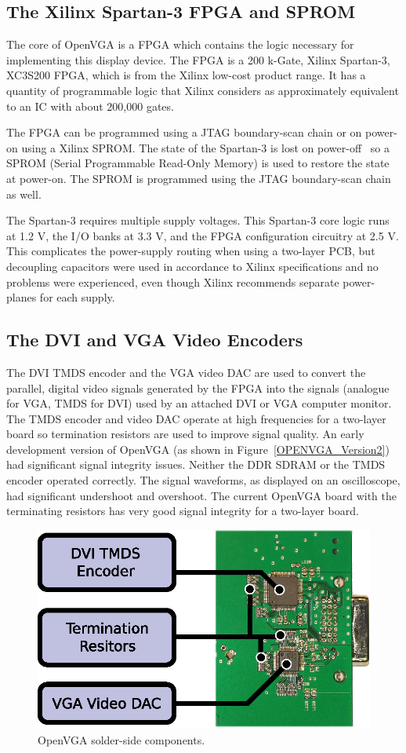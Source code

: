 \subsection{The Xilinx Spartan-3 FPGA and SPROM}
The core of OpenVGA is a FPGA which contains the logic necessary for implementing
this display device. The FPGA is a 200 k-Gate, Xilinx Spartan-3, XC3S200 FPGA,
which is from the Xilinx low-cost product range. It has a quantity of
programmable logic that Xilinx considers as approximately equivalent to an IC
with about 200,000 gates.

The FPGA can be programmed using a JTAG boundary-scan chain or on power-on using a Xilinx SPROM. The
state of the Spartan-3 is lost on power-off~\cite{Xilinx_SP3_DS} so a SPROM
(Serial Programmable Read-Only Memory) is used to restore the state at power-on.
The SPROM is programmed using the JTAG boundary-scan chain as well.

The Spartan-3 requires multiple supply voltages. This Spartan-3 core logic runs
at 1.2 V, the I/O banks at 3.3 V, and the FPGA configuration circuitry at 2.5 V.
This complicates the power-supply routing when using a two-layer PCB, but
decoupling capacitors were used in accordance to Xilinx specifications and no
problems were experienced, even though Xilinx recommends separate power-planes
for each supply.


\subsection{The DVI and VGA Video Encoders}
The DVI TMDS encoder and the VGA video DAC are used to convert the parallel,
digital video signals generated by the FPGA into the signals (analogue for VGA,
TMDS for DVI) used by an attached DVI or VGA computer monitor. The TMDS encoder
and video DAC operate at high frequencies for a two-layer board so termination
resistors are used to improve signal quality. An early development version of
OpenVGA (as shown in Figure~\ref{OPENVGA_Version2}) had significant signal
integrity issues. Neither the DDR SDRAM or the TMDS encoder operated correctly.
The signal waveforms, as displayed on an oscilloscope, had significant undershoot
and overshoot. The current OpenVGA board with the terminating resistors has very
good signal integrity for a two-layer board.

\begin{figure}[h!]
\begin{center}
\includegraphics[width=0.5\linewidth]{images/openvga_bot.eps}
\end{center}
\caption[OpenVGA solder-side components]{OpenVGA solder-side components.}
\label{HARD_Bot}
\end{figure}


